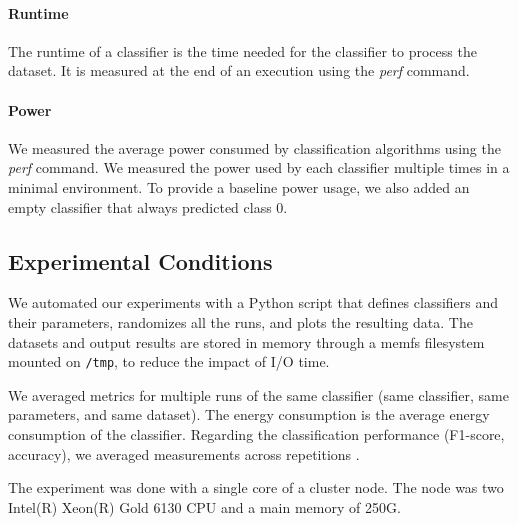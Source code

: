\paragraph{Runtime}
The runtime of a classifier is the time needed for
the classifier to process the dataset. It is
measured at the end of an execution using the
\textit{perf}
command.


\paragraph{Power} We measured the average power
consumed by classification algorithms using the
\textit{perf} command. We measured the power used by each
classifier multiple times in a minimal
environment. To provide a baseline power usage, we
also added an empty classifier that always
predicted class 0.

\subsection{Experimental Conditions}
We automated our experiments with a Python script that defines
classifiers and their parameters, randomizes all the runs, and plots the
resulting data. The datasets and output results are stored in memory
through a memfs filesystem mounted on \texttt{/tmp}, to reduce the impact of I/O time.

We averaged metrics for multiple runs of the same
classifier (same classifier, same parameters, and
same dataset). The energy
consumption is the average energy consumption of
the classifier. Regarding the
classification performance (F1-score, accuracy), we averaged measurements
across repetitions .

The experiment was done  with a single core of a
cluster node. The node was two Intel(R) Xeon(R)
Gold 6130 CPU and a main memory of 250G.

